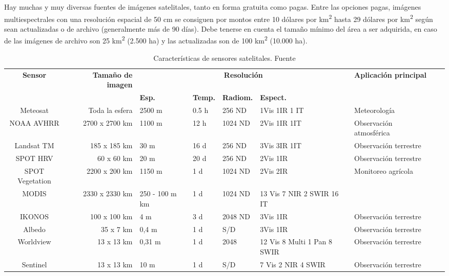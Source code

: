 Hay muchas y muy diversas fuentes de imágenes satelitales, tanto en forma gratuita como pagas. Entre las opciones pagas, imágenes multiespectrales con una resolución espacial de 50 cm se consiguen por montos entre 10 dólares por km\textsuperscript{2} hasta 29 dólares por km\textsuperscript{2} según sean actualizadas o de archivo (generalmente más de 90 días)\cite{noauthor_satellite_2020}. Debe tenerse en cuenta el tamaño mínimo del área a ser adquirida, en caso de las imágenes de archivo son 25 km\textsuperscript{2} (2.500 ha) y las actualizadas son de 100 km\textsuperscript{2} (10.000 ha).
\begin{table}[H]
    \centering
    \caption{Características de sensores satelitales. Fuente \cite{noauthor_3_nodate}}
    \begin{tabular}{c r p{10mm} p{15mm} p{15mm} p{15mm} p{15mm}p{15mm} p{15mm}|}
        \hline
        \hline
        \textbf{Sensor} & \textbf{Tamaño de imagen} & \multicolumn{4}{c}{\textbf{Resolución}} & \textbf{Aplicación principal} \\
        & & \textbf{Esp.} & \textbf{Temp.} & \textbf{Radiom.} & \textbf{Espect.}  &\\
        \hline \hline
        Meteosat & Toda la esfera & 	2500 m 	& 0.5 h 	& 256 ND 	& 1Vis 1IR 1 IT & Meteorología\\
        \hline
        NOAA AVHRR & 2700 x 2700 km	& 1100 m 	 	& 12 h 	& 1024 ND 	& 2Vis 1IR 1IT & Observación atmosférica\\
        \hline
        Landsat TM 	& 185 x 185 km & 30 m 	 	& 16 d 	& 256 ND 	& 3Vis 3IR 1IT & Observación terrestre\\
        \hline
        SPOT HRV & 60 x 60 km	& 20 m 	 	& 20 d	& 256 ND 	& 2Vis 1IR & Observación terrestre\\
        \hline
        SPOT Vegetation & 2200 x 200 km	& 1150 m 	 	& 1 d	& 1024 ND 	& 2Vis 2IR & Monitoreo agrícola\\
        \hline
        MODIS & 2330 x 2330 km	& 250 - 100 m 	 km 	& 1 d	& 1024 ND 	& 13 Vis 7 NIR 2 SWIR 16 IT\\
        \hline
        IKONOS & 100 x 100 km	& 4 m 	 	& 3 d 	& 2048 ND 	& 3Vis 1IR & Observación terrestre\\
        \hline
        Albedo & 35 x 7 km & 0,4 m  & 1 d & S/D & 3Vis 1IR & Observación terrestre\\
        \hline
         Worldview & 13 x 13 km & 0,31 m  & 1 d & 2048 & 12 Vis 8 Multi 1 Pan 8 SWIR & Observación terrestre\\
        \hline
         Sentinel & 13 x 13 km &  10 m & 1 d & S/D & 7 Vis 2 NIR 4 SWIR & Observación terrestre\\
        \hline
        \hline
    \end{tabular}

\label{Satelites}
\end{table}

